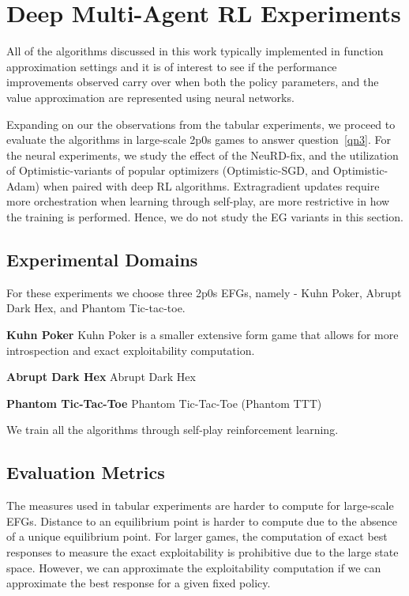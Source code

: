 \chapter{Deep Multi-Agent RL Experiments}
All of the algorithms discussed in this work typically implemented in function approximation
settings and it is of interest to see if the performance improvements observed carry over when both
the policy parameters, and the value approximation are represented using neural networks.

Expanding on our the observations from the tabular experiments, we proceed to evaluate the
algorithms in large-scale 2p0s games to answer question~\ref{qn3}.
For the neural experiments, we study the effect of the NeuRD-fix, and the utilization of
Optimistic-variants of popular optimizers (Optimistic-SGD, and Optimistic-Adam) when paired with
deep RL algorithms.
Extragradient updates require more orchestration when learning through self-play, are more
restrictive in how the training is performed.
Hence, we do not study the EG variants in this section.

\section{Experimental Domains}
For these experiments we choose three 2p0s EFGs, namely - Kuhn Poker, Abrupt Dark Hex, and Phantom
Tic-tac-toe.

\textbf{Kuhn Poker}
Kuhn Poker is a smaller extensive form game that allows for more introspection and exact
exploitability computation.

\textbf{Abrupt Dark Hex}
Abrupt Dark Hex

\textbf{Phantom Tic-Tac-Toe} Phantom Tic-Tac-Toe (Phantom TTT)

We train all the algorithms through self-play reinforcement learning.

\section{Evaluation Metrics}
The measures used in tabular experiments are harder to compute for large-scale EFGs.
Distance to an equilibrium point is harder to compute due to the absence of a unique equilibrium
point.
For larger games, the computation of exact best responses to measure the exact exploitability is
prohibitive due to the large state space.
However, we can approximate the exploitability computation if we can approximate the best response
for a given fixed policy.

